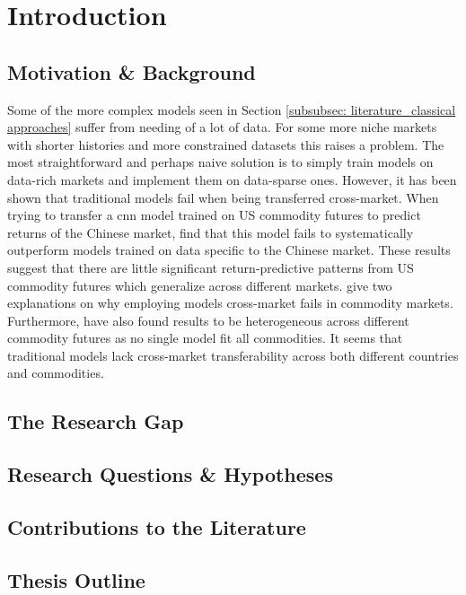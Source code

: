 
\section{Introduction}

\subsection{Motivation \& Background}
Some of the more complex models seen in Section \ref{subsubsec: literature_classical approaches} suffer from needing of a lot of data. For some more niche markets with shorter histories and more constrained datasets this raises a problem. The most straightforward and perhaps naive solution is to simply train models on data-rich markets and implement them on data-sparse ones. However, it has been shown that traditional models fail when being transferred  cross-market. When trying to transfer a \ac{cnn} model trained on US commodity futures to predict returns of the Chinese market, \textcite{haoPredictingCommodityReturns2025} find that this model fails to systematically outperform models trained on data specific to the Chinese market. These results suggest that there are little significant return-predictive patterns from US commodity futures which generalize across different markets.  \textcite{haoPredictingCommodityReturns2025} give two explanations on why employing models cross-market fails in commodity markets.  Furthermore, \textcite{nguyenModelingForecastingCommodity2018} have also found results to be heterogeneous across different commodity futures as no single model fit all commodities. It seems that traditional models lack cross-market transferability across both different countries and commodities.\par \medskip
\subsection{The Research Gap}

\subsection{Research Questions \& Hypotheses} \label{subsec: research question} 
\subsection{Contributions to the Literature}
\subsection{Thesis Outline}

